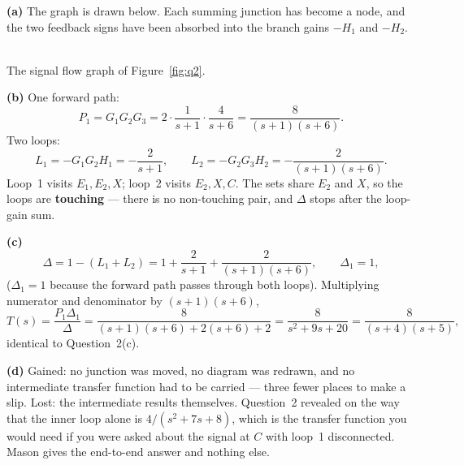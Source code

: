 \documentclass[11pt,a4paper]{article}
\begin{document}
\begin{solution}
\textbf{(a)} The graph is drawn below. Each summing junction has become a
node, and the two feedback signs have been absorbed into the branch gains
$-H_1$ and $-H_2$.

\begin{center}
\\[4pt]
{\footnotesize The signal flow graph of Figure~\ref{fig:q2}.}
\end{center}

\medskip
\textbf{(b)} One forward path:
\[
  P_1 = G_1G_2G_3 = 2\cdot\frac{1}{s+1}\cdot\frac{4}{s+6}
      = \frac{8}{(s+1)(s+6)} .
\]
Two loops:
\[
  L_1 = -G_1G_2H_1 = -\frac{2}{s+1},
  \qquad
  L_2 = -G_2G_3H_2 = -\frac{2}{(s+1)(s+6)} .
\]
Loop~1 visits $E_1, E_2, X$; loop~2 visits $E_2, X, C$. The sets share $E_2$
and $X$, so the loops are \textbf{touching} --- there is no non-touching pair,
and $\Delta$ stops after the loop-gain sum.

\medskip
\textbf{(c)}
\[
  \Delta = 1-(L_1+L_2) = 1+\frac{2}{s+1}+\frac{2}{(s+1)(s+6)},
  \qquad \Delta_1 = 1,
\]
($\Delta_1=1$ because the forward path passes through both loops). Multiplying
numerator and denominator by $(s+1)(s+6)$,
\[
  T(s)=\frac{P_1\Delta_1}{\Delta}
   =\frac{8}{(s+1)(s+6)+2(s+6)+2}
   =\frac{8}{s^{2}+9s+20}
   =\frac{8}{(s+4)(s+5)} ,
\]
identical to Question~2(c).

\medskip
\textbf{(d)} Gained: no junction was moved, no diagram was redrawn, and no
intermediate transfer function had to be carried --- three fewer places to make
a slip. Lost: the intermediate results themselves. Question~2 revealed on the
way that the inner loop alone is $4/(s^{2}+7s+8)$, which is the transfer
function you would need if you were asked about the signal at $C$ with loop~1
disconnected. Mason gives the end-to-end answer and nothing else.
\end{solution}
\end{document}
